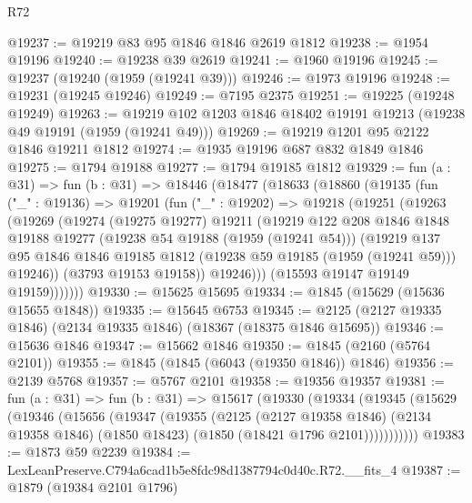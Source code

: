 \begin{lexlean}{R72}
\begin{coremodule}
@19237 := @19219 @83 @95 @1846 @1846 @2619 @1812
@19238 := @1954 @19196
@19240 := @19238 @39 @2619
@19241 := @1960 @19196
@19245 := @19237 (@19240 (@1959 (@19241 @39)))
@19246 := @1973 @19196
@19248 := @19231 (@19245 @19246)
@19249 := @7195 @2375
@19251 := @19225 (@19248 @19249)
@19263 := @19219 @102 @1203 @1846 @18402 @19191 @19213 (@19238 @49 @19191 (@1959 (@19241 @49)))
@19269 := @19219 @1201 @95 @2122 @1846 @19211 @1812
@19274 := @1935 @19196 @687 @832 @1849 @1846
@19275 := @1794 @19188
@19277 := @1794 @19185 @1812
@19329 := fun (a : @31) =>
  fun (b : @31) =>
  @18446
    (@18477
      (@18633
        (@18860
          (@19135
            (fun ("_" : @19136) =>
            @19201
              (fun ("_" : @19202) =>
              @19218
                (@19251
                  (@19263
                    (@19269
                      (@19274
                        (@19275 @19277)
                        @19211
                        (@19219
                          @122
                          @208
                          @1846
                          @1848
                          @19188
                          @19277
                          (@19238 @54 @19188 (@1959 (@19241 @54)))
                          (@19219
                            @137
                            @95
                            @1846
                            @1846
                            @19185
                            @1812
                            (@19238 @59 @19185 (@1959 (@19241 @59)))
                            @19246))
                        (@3793 @19153 @19158))
                      @19246)))
                (@15593 @19147 @19149 @19159)))))))
@19330 := @15625 @15695
@19334 := @1845 (@15629 (@15636 @15655 @1848))
@19335 := @15645 @6753
@19345 := @2125 (@2127 @19335 @1846) (@2134 @19335 @1846) (@18367 (@18375 @1846 @15695))
@19346 := @15636 @1846
@19347 := @15662 @1846
@19350 := @1845 (@2160 (@5764 @2101))
@19355 := @1845 (@1845 (@6043 (@19350 @1846)) @1846)
@19356 := @2139 @5768
@19357 := @5767 @2101
@19358 := @19356 @19357
@19381 := fun (a : @31) =>
  fun (b : @31) =>
  @15617
    (@19330
      (@19334
        (@19345
          (@15629
            (@19346
              (@15656
                (@19347
                  (@19355
                    (@2125
                      (@2127 @19358 @1846)
                      (@2134 @19358 @1846)
                      (@1850 @18423)
                      (@1850 (@18421 @1796 @2101)))))))))))
@19383 := @1873 @59 @2239
@19384 := LexLeanPreserve.C794a6cad1b5e8fdc98d1387794c0d40c.R72.__fits_4
@19387 := @1879 (@19384 @2101 @1796)

\end{coremodule}
\end{lexlean}
